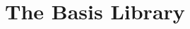 \documentclass{jbook}
\newcommand{\txt}[2]{#2}
\begin{document}
% 
% 
% 


% 
\chapter{\txt{標準ライブラリ}{The Basis Library}}
\end{document}
